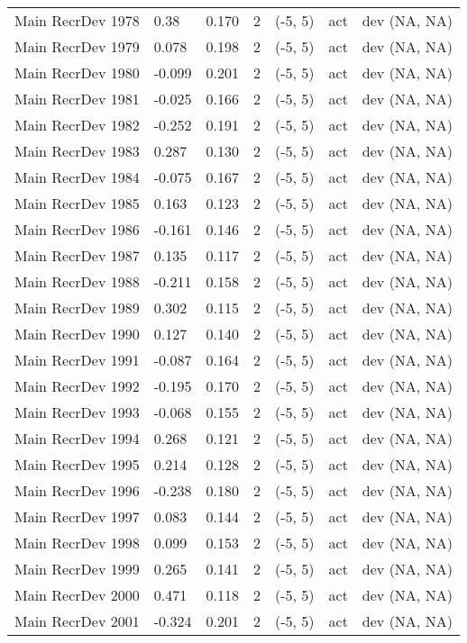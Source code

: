 \documentclass[11pt,
  letterpaper,
]{article}
\begin{document}
\begin{landscape}
\begin{longtable}[t]{>{\raggedright\arraybackslash}p{7.5cm}lllll>{\raggedright\arraybackslash}p{3.5cm}}
Main RecrDev 1978 & 0.38 & 0.170 & 2 & (-5, 5) & act & dev (NA, NA)\\
Main RecrDev 1979 & 0.078 & 0.198 & 2 & (-5, 5) & act & dev (NA, NA)\\
Main RecrDev 1980 & -0.099 & 0.201 & 2 & (-5, 5) & act & dev (NA, NA)\\
Main RecrDev 1981 & -0.025 & 0.166 & 2 & (-5, 5) & act & dev (NA, NA)\\
Main RecrDev 1982 & -0.252 & 0.191 & 2 & (-5, 5) & act & dev (NA, NA)\\
Main RecrDev 1983 & 0.287 & 0.130 & 2 & (-5, 5) & act & dev (NA, NA)\\
Main RecrDev 1984 & -0.075 & 0.167 & 2 & (-5, 5) & act & dev (NA, NA)\\
Main RecrDev 1985 & 0.163 & 0.123 & 2 & (-5, 5) & act & dev (NA, NA)\\
Main RecrDev 1986 & -0.161 & 0.146 & 2 & (-5, 5) & act & dev (NA, NA)\\
Main RecrDev 1987 & 0.135 & 0.117 & 2 & (-5, 5) & act & dev (NA, NA)\\
Main RecrDev 1988 & -0.211 & 0.158 & 2 & (-5, 5) & act & dev (NA, NA)\\
Main RecrDev 1989 & 0.302 & 0.115 & 2 & (-5, 5) & act & dev (NA, NA)\\
Main RecrDev 1990 & 0.127 & 0.140 & 2 & (-5, 5) & act & dev (NA, NA)\\
Main RecrDev 1991 & -0.087 & 0.164 & 2 & (-5, 5) & act & dev (NA, NA)\\
Main RecrDev 1992 & -0.195 & 0.170 & 2 & (-5, 5) & act & dev (NA, NA)\\
Main RecrDev 1993 & -0.068 & 0.155 & 2 & (-5, 5) & act & dev (NA, NA)\\
Main RecrDev 1994 & 0.268 & 0.121 & 2 & (-5, 5) & act & dev (NA, NA)\\
Main RecrDev 1995 & 0.214 & 0.128 & 2 & (-5, 5) & act & dev (NA, NA)\\
Main RecrDev 1996 & -0.238 & 0.180 & 2 & (-5, 5) & act & dev (NA, NA)\\
Main RecrDev 1997 & 0.083 & 0.144 & 2 & (-5, 5) & act & dev (NA, NA)\\
Main RecrDev 1998 & 0.099 & 0.153 & 2 & (-5, 5) & act & dev (NA, NA)\\
Main RecrDev 1999 & 0.265 & 0.141 & 2 & (-5, 5) & act & dev (NA, NA)\\
Main RecrDev 2000 & 0.471 & 0.118 & 2 & (-5, 5) & act & dev (NA, NA)\\
Main RecrDev 2001 & -0.324 & 0.201 & 2 & (-5, 5) & act & dev (NA, NA)\\

\end{longtable}
\end{landscape}
\end{document}
